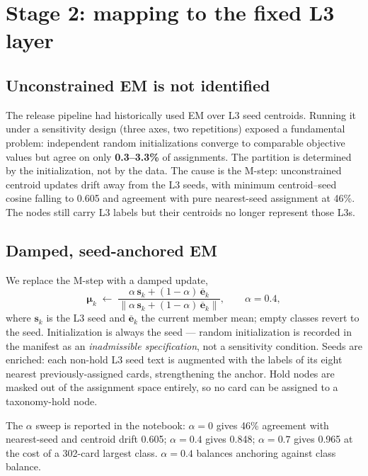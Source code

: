 \documentclass[11pt,a4paper]{article}
\begin{document}
\section{Stage 2: mapping to the fixed L3 layer}

\subsection{Unconstrained EM is not identified}

The release pipeline had historically used EM over L3 seed centroids. Running it under a sensitivity design (three axes, two repetitions) exposed a fundamental problem: independent random initializations converge to comparable objective values but agree on only \textbf{0.3--3.3\%} of assignments. The partition is determined by the initialization, not by the data. The cause is the M-step: unconstrained centroid updates drift away from the L3 seeds, with minimum centroid--seed cosine falling to 0.605 and agreement with pure nearest-seed assignment at 46\%. The nodes still carry L3 labels but their centroids no longer represent those L3s.

\subsection{Damped, seed-anchored EM}

We replace the M-step with a damped update,
\begin{equation}
\bm{\mu}_k \;\leftarrow\; \frac{\alpha\,\mathbf{s}_k + (1-\alpha)\,\overline{\mathbf{e}}_k}{\lVert \alpha\,\mathbf{s}_k + (1-\alpha)\,\overline{\mathbf{e}}_k \rVert}, \qquad \alpha = 0.4,
\end{equation}
where $\mathbf{s}_k$ is the L3 seed and $\overline{\mathbf{e}}_k$ the current member mean; empty classes revert to the seed. Initialization is always the seed --- random initialization is recorded in the manifest as an \emph{inadmissible specification}, not a sensitivity condition. Seeds are enriched: each non-hold L3 seed text is augmented with the labels of its eight nearest previously-assigned cards, strengthening the anchor. Hold nodes are masked out of the assignment space entirely, so no card can be assigned to a taxonomy-hold node.

The $\alpha$ sweep is reported in the notebook: $\alpha=0$ gives 46\% agreement with nearest-seed and centroid drift 0.605; $\alpha=0.4$ gives 0.848; $\alpha=0.7$ gives 0.965 at the cost of a 302-card largest class. $\alpha=0.4$ balances anchoring against class balance.
\end{document}
